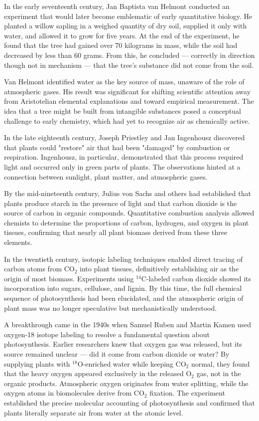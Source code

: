 \begin{historical}
In the early seventeenth century, Jan Baptista van Helmont conducted an experiment that would later become emblematic of early quantitative biology. He planted a willow sapling in a weighed quantity of dry soil, supplied it only with water, and allowed it to grow for five years. At the end of the experiment, he found that the tree had gained over 70 kilograms in mass, while the soil had decreased by less than 60 grams. From this, he concluded — correctly in direction though not in mechanism — that the tree's substance did not come from the soil.

Van Helmont identified water as the key source of mass, unaware of the role of atmospheric gases. His result was significant for shifting scientific attention away from Aristotelian elemental explanations and toward empirical measurement. The idea that a tree might be built from intangible substances posed a conceptual challenge to early chemistry, which had yet to recognize air as chemically active.

In the late eighteenth century, Joseph Priestley and Jan Ingenhousz discovered that plants could "restore" air that had been "damaged" by combustion or respiration. Ingenhousz, in particular, demonstrated that this process required light and occurred only in green parts of plants. The observations hinted at a connection between sunlight, plant matter, and atmospheric gases.

By the mid-nineteenth century, Julius von Sachs and others had established that plants produce starch in the presence of light and that carbon dioxide is the source of carbon in organic compounds. Quantitative combustion analysis allowed chemists to determine the proportions of carbon, hydrogen, and oxygen in plant tissues, confirming that nearly all plant biomass derived from these three elements.

In the twentieth century, isotopic labeling techniques enabled direct tracing of carbon atoms from \(\mathrm{CO}_2\) into plant tissues, definitively establishing air as the origin of most biomass. Experiments using \(^{14}\mathrm{C}\)-labeled carbon dioxide showed its incorporation into sugars, cellulose, and lignin. By this time, the full chemical sequence of photosynthesis had been elucidated, and the atmospheric origin of plant mass was no longer speculative but mechanistically understood.

A breakthrough came in the 1940s when Samuel Ruben and Martin Kamen used oxygen-18 isotope labeling to resolve a fundamental question about photosynthesis. Earlier researchers knew that oxygen gas was released, but its source remained unclear — did it come from carbon dioxide or water? By supplying plants with  \(^{18}\mathrm{O}\)-enriched water while keeping \(\mathrm{CO}_2\) normal, they found that the heavy oxygen appeared exclusively in the released \(\mathrm{O}_2\) gas, not in the organic products. Atmospheric oxygen originates from water splitting, while the oxygen atoms in biomolecules derive from \(\mathrm{CO}_2\) fixation. The experiment established the precise molecular accounting of photosynthesis and confirmed that plants literally separate air from water at the atomic level.


\end{historical}
